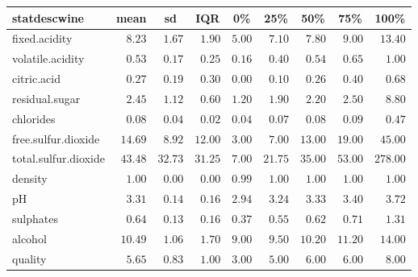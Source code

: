 \begin{table}[!tbp]
\begin{center}
\begin{tabular}{lrrrrrrrr}
\hline\hline
\multicolumn{1}{l}{statdescwine}&\multicolumn{1}{c}{mean}&\multicolumn{1}{c}{sd}&\multicolumn{1}{c}{IQR}&\multicolumn{1}{c}{0\%}&\multicolumn{1}{c}{25\%}&\multicolumn{1}{c}{50\%}&\multicolumn{1}{c}{75\%}&\multicolumn{1}{c}{100\%}\tabularnewline
\hline
fixed.acidity&$ 8.23$&$ 1.67$&$ 1.90$&$5.00$&$ 7.10$&$ 7.80$&$ 9.00$&$ 13.40$\tabularnewline
volatile.acidity&$ 0.53$&$ 0.17$&$ 0.25$&$0.16$&$ 0.40$&$ 0.54$&$ 0.65$&$  1.00$\tabularnewline
citric.acid&$ 0.27$&$ 0.19$&$ 0.30$&$0.00$&$ 0.10$&$ 0.26$&$ 0.40$&$  0.68$\tabularnewline
residual.sugar&$ 2.45$&$ 1.12$&$ 0.60$&$1.20$&$ 1.90$&$ 2.20$&$ 2.50$&$  8.80$\tabularnewline
chlorides&$ 0.08$&$ 0.04$&$ 0.02$&$0.04$&$ 0.07$&$ 0.08$&$ 0.09$&$  0.47$\tabularnewline
free.sulfur.dioxide&$14.69$&$ 8.92$&$12.00$&$3.00$&$ 7.00$&$13.00$&$19.00$&$ 45.00$\tabularnewline
total.sulfur.dioxide&$43.48$&$32.73$&$31.25$&$7.00$&$21.75$&$35.00$&$53.00$&$278.00$\tabularnewline
density&$ 1.00$&$ 0.00$&$ 0.00$&$0.99$&$ 1.00$&$ 1.00$&$ 1.00$&$  1.00$\tabularnewline
pH&$ 3.31$&$ 0.14$&$ 0.16$&$2.94$&$ 3.24$&$ 3.33$&$ 3.40$&$  3.72$\tabularnewline
sulphates&$ 0.64$&$ 0.13$&$ 0.16$&$0.37$&$ 0.55$&$ 0.62$&$ 0.71$&$  1.31$\tabularnewline
alcohol&$10.49$&$ 1.06$&$ 1.70$&$9.00$&$ 9.50$&$10.20$&$11.20$&$ 14.00$\tabularnewline
quality&$ 5.65$&$ 0.83$&$ 1.00$&$3.00$&$ 5.00$&$ 6.00$&$ 6.00$&$  8.00$\tabularnewline
\hline
\end{tabular}\end{center}
\end{table}
